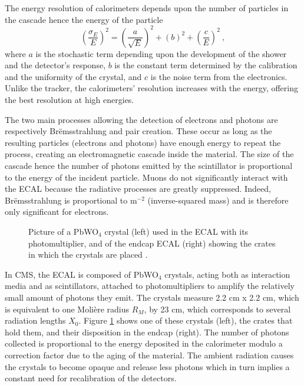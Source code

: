   The energy resolution of calorimeters depends upon the number of particles in the cascade hence the energy of the particle
  \begin{equation}
    \left( \frac{\sigma_E}{E} \right)^2 = \left( \frac{a}{\sqrt{E}} \right)^2 + \left( b \right)^2 + \left( \frac{c}{E} \right)^2 \ ,
  \end{equation}
  where $ a $ is the stochastic term depending upon the development of the shower and the detector's response, $ b $ is the constant term determined by the calibration and the uniformity of the crystal, and $ c $ is the noise term from the electronics. Unlike the tracker, the calorimeters' resolution increases with the energy, offering the best resolution at high energies.

  The two main processes allowing the detection of electrons and photons are respectively Brëmsstrahlung and pair creation. These occur as long as the resulting particles (electrons and photons) have enough energy to repeat the process, creating an electromagnetic cascade inside the material. The size of the cascade hence the number of photons emitted by the scintillator is proportional to the energy of the incident particle. Muons do not significantly interact with the ECAL because the radiative processes are greatly suppressed. Indeed, Brëmsstrahlung is proportional to m$ ^{-2} $ (inverse-squared mass) and is therefore only significant for electrons. \\

  \begin{figure}[h!]
    \centering
    \caption{Picture of a PbWO$ _4 $ crystal (left) used in the ECAL with its photomultiplier, and of the endcap ECAL (right) showing the crates in which the crystals are placed \Cite{CMS_at_LHC}.}
    \label{fig:lhc_and_cms__cms_ecal_view}
  \end{figure}

  In CMS, the ECAL is composed of PbWO$ _4 $ crystals, acting both as interaction media and as scintillators, attached to photomultipliers to amplify the relatively small amount of photons they emit. The crystals measure 2.2 cm x 2.2 cm, which is equivalent to one Molière radius $ R_M $, by 23 cm, which corresponds to several radiation lengths $ X_0 $. Figure \ref{fig:lhc_and_cms__cms_ecal_view} shows one of these crystals (left), the crates that hold them, and their disposition in the endcap (right). The number of photons collected is proportional to the energy deposited in the calorimeter modulo a correction factor due to the aging of the material. The ambient radiation causes the crystals to become opaque and release less photons which in turn implies a constant need for recalibration of the detectors.

